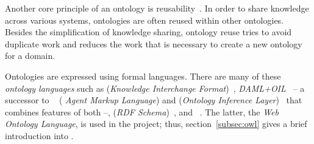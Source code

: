 \vspace{1em}

Another core principle of an ontology is reusability~\cite{reuse1,reuse2}. In order to share knowledge across various systems, ontologies are often reused within other ontologies. Besides the simplification of knowledge sharing, ontology reuse tries to avoid duplicate work and reduces the work that is necessary to create a new ontology for a domain.

\vspace{1em}

Ontologies are expressed using formal languages. There are many of these \emph{ontology languages} such as  (\emph{Knowledge Interchange Format})~\cite{KIFReference}, \emph{DAML+OIL}~\cite{DAML+OIL} -- a successor to ~\cite{DAML} (\emph{ Agent Markup Language}) and  (\emph{Ontology Inference Layer})~\cite{OIL} that combines features of both --,  (\emph{RDF Schema})~\cite{RDFS}, and ~\cite{OWL}. The latter, the \emph{Web Ontology Language}, is used in the \thinkhome project; thus, section~\ref{subsec:owl} gives a brief introduction into .

